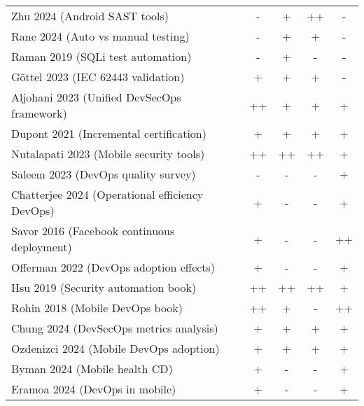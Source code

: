 \documentclass[bscthesis,finnish,oneside,biblatex]{uefcsthesis}
\begin{document}
\begin{table}[htbp]
\begin{tabular}{p{7cm}cccc}
            Zhu 2024 (Android SAST tools)                   & -            & +            & ++           & -            \\
            Rane 2024 (Auto vs manual testing)              & -            & +            & +            & -            \\
            Raman 2019 (SQLi test automation)               & -            & +            & -            & -            \\
            Göttel 2023 (IEC 62443 validation)              & +            & +            & +            & -            \\
            Aljohani 2023 (Unified DevSecOps framework)     & ++           & +            & +            & +            \\
            Dupont 2021 (Incremental certification)         & +            & +            & +            & +            \\
            Nutalapati 2023 (Mobile security tools)         & ++           & ++           & ++           & +            \\
            Saleem 2023 (DevOps quality survey)             & -            & -            & -            & +            \\
            Chatterjee 2024 (Operational efficiency DevOps) & +            & -            & -            & +            \\
            Savor 2016 (Facebook continuous deployment)     & +            & -            & -            & ++           \\
            Offerman 2022 (DevOps adoption effects)         & +            & -            & -            & +            \\
            Hsu 2019 (Security automation book)             & ++           & ++           & ++           & +            \\
            Rohin 2018 (Mobile DevOps book)                 & ++           & +            & -            & ++           \\
            Chung 2024 (DevSecOps metrics analysis)         & +            & +            & +            & +            \\
            Ozdenizci 2024 (Mobile DevOps adoption)         & +            & +            & +            & +            \\
            Byman 2024 (Mobile health CD)                   & +            & -            & -            & +            \\
            Eramoa 2024 (DevOps in mobile)                  & +            & -            & -            & +            \\
            \bottomrule
        \end{tabular}
    \end{table}
\end{document}
